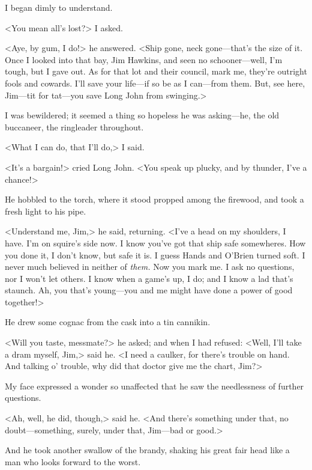 I began dimly to understand.

<You mean all's lost?> I asked.

<Aye, by gum, I do!> he answered. <Ship gone, neck gone—that's the size of it. Once I looked into that bay, Jim Hawkins, and seen no schooner—well, I'm tough, but I gave out. As for that lot and their council, mark me, they're outright fools and cowards. I'll save your life—if so be as I can—from them. But, see here, Jim—tit for tat—you save Long John from swinging.>

I was bewildered; it seemed a thing so hopeless he was asking—he, the old buccaneer, the ringleader throughout.

<What I can do, that I'll do,> I said.

<It's a bargain!> cried Long John. <You speak up plucky, and by thunder, I've a chance!>

He hobbled to the torch, where it stood propped among the firewood, and took a fresh light to his pipe.

<Understand me, Jim,> he said, returning. <I've a head on my shoulders, I have. I'm on squire's side now. I know you've got that ship safe somewheres. How you done it, I don't know, but safe it is. I guess Hands and O'Brien turned soft. I never much believed in neither of \textit{them.} Now you mark me. I ask no questions, nor I won't let others. I know when a game's up, I do; and I know a lad that's staunch. Ah, you that's young—you and me might have done a power of good together!>

He drew some cognac from the cask into a tin cannikin.

<Will you taste, messmate?> he asked; and when I had refused: <Well, I'll take a dram myself, Jim,> said he. <I need a caulker, for there's trouble on hand. And talking o' trouble, why did that doctor give me the chart, Jim?>

My face expressed a wonder so unaffected that he saw the needlessness of further questions.

<Ah, well, he did, though,> said he. <And there's something under that, no doubt—something, surely, under that, Jim—bad or good.>

And he took another swallow of the brandy, shaking his great fair head like a man who looks forward to the worst.